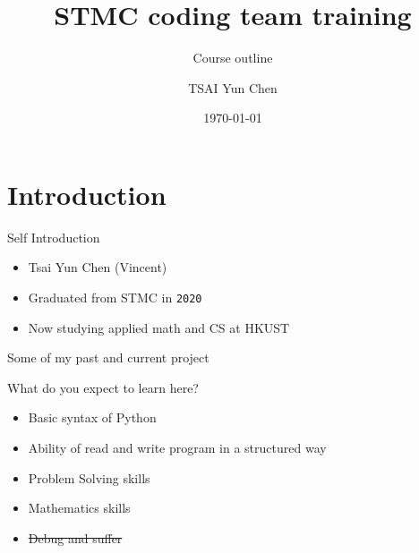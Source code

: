 \documentclass[10pt,xcolor={table,dvipsnames},t]{beamer}
\title[Your Short Title]{STMC coding team training}
\subtitle{Course outline}
\author{TSAI Yun Chen}
\date{\today}
\begin{document}
\begin{frame}
  \titlepage
\end{frame}


\section{Introduction}

\begin{frame}{Self Introduction}

\begin{itemize}
  \item Tsai Yun Chen (Vincent)
  \item Graduated from STMC in \texttt{2020}
  \item Now studying applied math and CS at HKUST
\end{itemize}


\end{frame}

\begin{frame}{Some of my past and current project}
  
\end{frame}



  

\begin{frame}{What do you expect to learn here?}
  \begin{itemize}
    \item Basic syntax of Python
    \item Ability of read and write program in a structured way
    \item Problem Solving skills
    \item Mathematics skills
    \item \sout{Debug and suffer}
  \end{itemize}
  
\end{frame}
\end{document}
